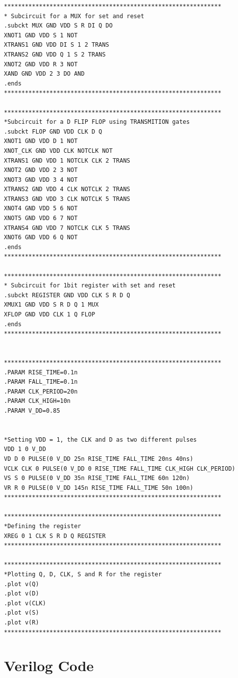 \begin{lstlisting}[style=aimspiceStyle, caption=1-bit register in AIMSPICE, label=testcode]
**************************************************************
* Subcircuit for a MUX for set and reset
.subckt MUX GND VDD S R DI Q DO
XNOT1 GND VDD S 1 NOT
XTRANS1 GND VDD DI S 1 2 TRANS
XTRANS2 GND VDD Q 1 S 2 TRANS
XNOT2 GND VDD R 3 NOT
XAND GND VDD 2 3 DO AND
.ends 
**************************************************************

**************************************************************
*Subcircuit for a D FLIP FLOP using TRANSMITION gates 
.subckt FLOP GND VDD CLK D Q 
XNOT1 GND VDD D 1 NOT
XNOT_CLK GND VDD CLK NOTCLK NOT
XTRANS1 GND VDD 1 NOTCLK CLK 2 TRANS
XNOT2 GND VDD 2 3 NOT
XNOT3 GND VDD 3 4 NOT 
XTRANS2 GND VDD 4 CLK NOTCLK 2 TRANS
XTRANS3 GND VDD 3 CLK NOTCLK 5 TRANS
XNOT4 GND VDD 5 6 NOT
XNOT5 GND VDD 6 7 NOT
XTRANS4 GND VDD 7 NOTCLK CLK 5 TRANS
XNOT6 GND VDD 6 Q NOT
.ends
**************************************************************

**************************************************************
* Subcircuit for 1bit register with set and reset
.subckt REGISTER GND VDD CLK S R D Q 
XMUX1 GND VDD S R D Q 1 MUX
XFLOP GND VDD CLK 1 Q FLOP
.ends
**************************************************************


**************************************************************
.PARAM RISE_TIME=0.1n 
.PARAM FALL_TIME=0.1n 
.PARAM CLK_PERIOD=20n 
.PARAM CLK_HIGH=10n 
.PARAM V_DD=0.85


*Setting VDD = 1, the CLK and D as two different pulses
VDD 1 0 V_DD
VD D 0 PULSE(0 V_DD 25n RISE_TIME FALL_TIME 20ns 40ns)
VCLK CLK 0 PULSE(0 V_DD 0 RISE_TIME FALL_TIME CLK_HIGH CLK_PERIOD)
VS S 0 PULSE(0 V_DD 35n RISE_TIME FALL_TIME 60n 120n)
VR R 0 PULSE(0 V_DD 145n RISE_TIME FALL_TIME 50n 100n)
**************************************************************

**************************************************************
*Defining the register
XREG 0 1 CLK S R D Q REGISTER
**************************************************************

**************************************************************
*Plotting Q, D, CLK, S and R for the register
.plot v(Q)
.plot v(D)
.plot v(CLK)
.plot v(S) 
.plot v(R)
**************************************************************

\end{lstlisting}


\section{Verilog Code}

